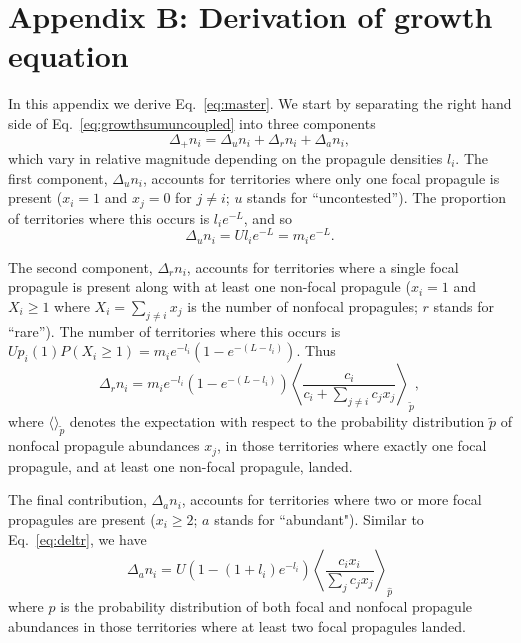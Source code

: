 \documentclass[12pt]{article}
\begin{document}
\section*{Appendix B: Derivation of growth equation}

In this appendix we derive Eq.~\eqref{eq:master}. We start by separating the right hand side of Eq.~\eqref{eq:growthsumuncoupled} into three components
\begin{equation}
\Delta_+ n_i = \Delta_u n_i+\Delta_r n_i+\Delta_a n_i,
\end{equation}
which vary in relative magnitude depending on the propagule densities $l_i$. The first component, $\Delta_u n_i$, accounts for territories where only one focal propagule is present ($x_i=1$ and $x_j=0$ for $j\neq i$; $u$ stands for ``uncontested''). The proportion of territories where this occurs is $l_i e^{-L}$, and so 
\begin{equation}
\Delta_u n_i=Ul_i e^{-L}=m_i e^{-L}.
\end{equation}

The second component, $\Delta_r n_i$, accounts for territories where a single focal propagule is present along with at least one non-focal propagule ($x_i=1$ and $X_i\geq 1$ where $X_i=\sum_{j\neq i} x_j$ is the number of nonfocal propagules; $r$ stands for ``rare''). The number of territories where this occurs is $Up_i(1)P(X_i\geq 1)=m_i e^{-l_i}(1-e^{-(L-l_i)})$. Thus 
\begin{equation}
\Delta_r n_i = m_i e^{-l_i}(1-e^{-(L-l_i)})\left\langle  \frac{c_i}{c_i +\sum_{j\neq i} c_j x_j } \right\rangle_{\tilde{p}},  \label{eq:deltr}
\end{equation}
where $\langle \rangle_{\tilde{p}}$ denotes the expectation with respect to the probability distribution $\tilde{p}$ of nonfocal propagule abundances $x_j$, in those territories where exactly one focal propagule, and at least one non-focal propagule, landed. 

The final contribution, $\Delta_a n_i$, accounts for territories where two or more focal propagules are present ($x_i\geq 2$; $a$ stands for ``abundant"). Similar to Eq.~\eqref{eq:deltr}, we have 
\begin{equation}
\Delta_a n_i=U(1-(1+l_i)e^{-l_i})\left\langle \frac{c_i x_i}{\sum_j c_j x_j} \right\rangle_{\hat{p}}\label{eq:delta}
\end{equation}
where $\hat{p}$ is the probability distribution of both focal and nonfocal propagule abundances in those territories where at least two focal propagules landed. 
\end{document}

